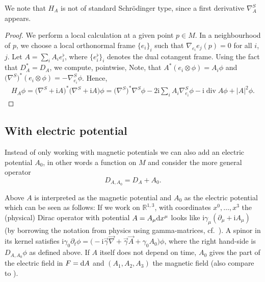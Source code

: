 \documentclass[10pt,a4paper]{amsart}
\numberwithin{equation}{section}
\begin{document}
We note that $H_A$ is not of standard Schr\"odinger type, since a first derivative $\nabla_A^S$ appears.
\begin{proof}We perform a local calculation at a given point $p\in M$. In a neighbourhood of $p$, we choose a local orthonormal frame $\{e_i\}_i$ such that $\nabla_{e_i}e_j(p)=0$ for all $i$, $j$.
Let $A=\sum_i A_i e_i^\flat$, where $\bigl\{e_i^\flat\bigr\}_i$ denotes the dual cotangent frame. Using the fact that $D_A^*=D_A$, we compute, pointwise,
Note, that $A^*(e_i\otimes \phi)= A_i\phi$ and $\bigl(\nabla^S\bigr)^*(e_i\otimes \phi)=-\nabla^S_{e_i}\phi$. Hence,
\begin{align*}
H_{A}\phi = \bigl(\nabla^S + {\mathrm{i}}A\bigr)^*\bigl(\nabla^S + {\mathrm{i}}A \bigr) \phi
= \bigl(\nabla^S\bigr)^*\nabla^S\phi -2{\mathrm{i}}\sum_i A_i \nabla^S_{e_i}\phi -{\mathrm{i}}\operatorname{div} A \phi +|A|^2\phi. \tag*{\qed}
\end{align*}\renewcommand{\qed}{}
\end{proof}

\subsection{With electric potential}
Instead of only working with magnetic potentials we can also add an electric potential $A_0$, in other words a function on $M$ and consider the more general operator
\[ D_{A, A_0}=D_A+A_0.\]
\begin{Remark}\label{rem_pot_types}
Above $A$ is interpreted as the magnetic potential and $A_0$ as the electric potential which can be seen as follows: If we work on ${\mathbb R}^{1,3}$, with coordinates $x^0, \ldots, x^3$ the (physical) Dirac operator with potential $A=A_\mu {\rm d}x^\mu$ looks like ${\mathrm{i}}\gamma_\mu (\partial_\mu + {\mathrm{i}}A_\mu)$ (by borrowing the notation from physics using gamma-matrices, cf.\ \cite{Thaller}). A spinor in its kernel satisfies ${\mathrm{i}}\gamma_0 \partial_t \phi = \bigl(-{\mathrm{i}} \vec{\gamma}\vec{\nabla} + \vec{\gamma} \vec{A} + \gamma_0A_0\bigr)\phi$, where the right hand-side is $D_{A,A_0}\phi$ as defined above. If $A$ itself does not depend on time, $A_0$ gives the part of the electric field in $F={\rm d}A$ and $(A_1, A_2, A_3)$ the magnetic field (also compare to \cite[Section~4.2]{Thaller}).
\end{Remark}
\end{document}
